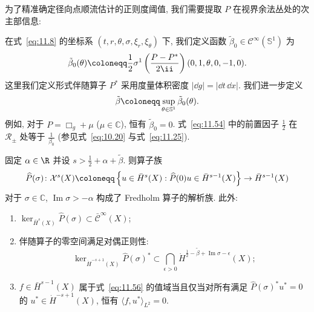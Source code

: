 为了精准确定径向点顺流估计的正则度阈值, 我们需要提取 $P$ 在视界余法丛处的次主部信息:

\begin{definition}[次主阈值平移量]\label{def:11.15}
在式~\eqref{eq:11.8} 的坐标系 $(t, r, \theta, \sigma, \xi_r, \xi_\theta)$ 下, 我们定义函数 $\tilde\beta_0 \in \mathcal{C}^\infty(\mathbb{S}^1)$ 为
\begin{equation}\label{eq:11.54}
    \tilde\beta_0(\theta) \defeq \frac{1}{2} \sigma^1\left( \frac{P - P^*}{2\ii} \right)(0, 1, \theta, 0, -1, 0).
\end{equation}
这里我们定义形式伴随算子 $P^*$ 采用度量体积密度 $|\dd g| = |\dd t \,\dd x|$. 我们进一步定义
\begin{equation}\label{eq:11.55}
    \tilde\beta \defeq \sup_{\theta \in \mathbb{S}^1} \tilde\beta_0(\theta).
\end{equation}
例如, 对于 $P = \Box_g + \mu$ ($\mu \in \mathbb{C}$), 恒有 $\tilde\beta_0 = 0$. 式~\eqref{eq:11.54} 中的前置因子 $\frac{1}{2}$ 在 $\mathcal{R}_\pm$ 处等于 $\frac{1}{\beta_0}$ (参见式~\eqref{eq:10.20} 与式~\eqref{eq:11.25}).
\end{definition}

\begin{theorem}\label{thm:11.16}
固定 $\alpha \in \R$ 并设 $s > \frac{1}{2} + \alpha + \tilde\beta$. 则算子族
\begin{equation}\label{eq:11.56}
    \widehat{P}(\sigma) \colon \mathcal{X}^s(X) \defeq \left\{ u \in \bar H^s(X) : \widehat{P}(0) u \in \bar H^{s-1}(X) \right\} \to \bar H^{s-1}(X)
\end{equation}
对于 $\sigma \in \mathbb{C}$, $\operatorname{Im}\sigma > -\alpha$ 构成了 Fredholm 算子的解析族. 此外:
\begin{enumerate}[label=(\arabic*)]
    \item $\ker_{\bar H^s(X)} \widehat{P}(\sigma) \subset \bar{\mathcal{C}}^\infty(X)$;
    \item 伴随算子的零空间满足对偶正则性:
    \[
        \ker_{\dot H^{-s+1}(X)} \widehat{P}(\sigma)^* \subset \bigcap_{\epsilon > 0} \dot H^{\frac{1}{2} - \tilde\beta + \operatorname{Im}\sigma - \epsilon}(X);
    \]
    \item $f \in \bar H^{s-1}(X)$ 属于式~\eqref{eq:11.56} 的值域当且仅当对所有满足 $\widehat{P}(\sigma)^* u^* = 0$ 的 $u^* \in \dot H^{-s+1}(X)$, 恒有 $\langle f, u^* \rangle_{L^2} = 0$.
\end{enumerate}
\end{theorem}

